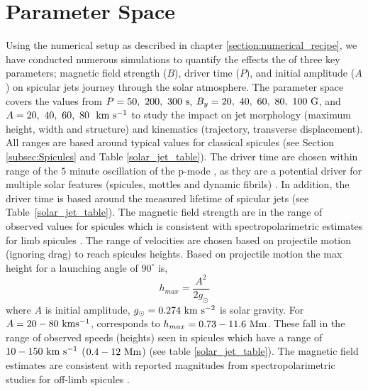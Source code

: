 \documentclass[12pt]{ociamthesis}
\newcommand{\kms}{~\rm{km ~s^{-1}}}
\begin{document}
\section{Parameter Space}
\label{subsec:paramater_space}
Using the numerical setup as described in chapter \ref{section:numerical_recipe}, we have conducted numerous simulations to quantify the effects the of three key parameters; magnetic field strength ($B$), driver time ($P$), and initial amplitude ($A$) on spicular jets journey through the solar atmosphere. The parameter space covers the values from $P=50,~200,~300~\rm{s}$, $B_y=20,~40,~60,~80,~100~\rm{G}$, and $A=20,~40,~60,~80~\kms$ to study the impact on jet morphology (maximum height, width and structure) and kinematics (trajectory, transverse displacement). All ranges are based around typical values for classical spicules (see Section \ref{subsec:Spicules} and Table \ref{solar_jet_table}). The driver time are chosen within range of the $5$ minute oscillation of the p-mode \citep{Leighton1962ApJ135474L}, as they are a potential driver for multiple solar features (spicules, mottles  and dynamic fibrils) \citep{Pontieu2004Natur}. In addition, the driver time is based around the measured lifetime of spicular jets (see Table~\ref{solar_jet_table}). The magnetic field strength are in the range of observed values for spicules which is consistent with spectropolarimetric estimates for limb spicules \citep{centeno2010, suarez2015}. The range of velocities are chosen based on projectile motion (ignoring drag) to reach spicules heights. Based on projectile motion the max height for a launching angle of $90^{\circ}$ is,
\begin{equation}
h_{max} = \frac{A^2}{2g_{\odot}}
\end{equation}
where $A$ is initial amplitude, $g_{\odot}=0.274~\rm{km~s^{-2}}$ is solar gravity. For $A=20-80~\rm{km s^{-1}}$, corresponds to $h_{max}=0.73-11.6~\rm{Mm}$. These fall in the range of observed speeds (heights) seen in spicules which have a range of $10-150\kms$ ($0.4-12~\rm{Mm}$) (see table \ref{solar_jet_table}). The magnetic field estimates are consistent with reported magnitudes from spectropolarimetric studies for off-limb spicules \citep{centeno2010, suarez2015}.
\end{document}
